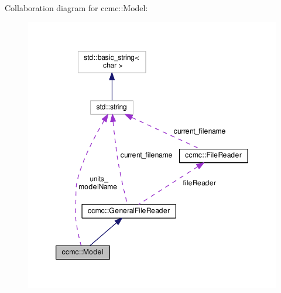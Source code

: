 Collaboration diagram for ccmc\-:\-:Model\-:
\nopagebreak
\begin{figure}[H]
\begin{center}
\leavevmode
\includegraphics[width=349pt]{classccmc_1_1_model__coll__graph}
\end{center}
\end{figure}
